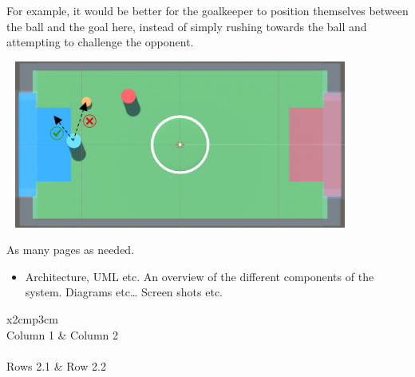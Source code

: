 \begin{flushleft}
For example, it would be better for the goalkeeper to position themselves between the ball and the goal here, instead of simply rushing towards the ball and attempting to challenge the opponent.
\end{flushleft}

\vspace{8mm}
\centering
\includegraphics[width=115mm, height=55mm]{img/Image4.png}
\vspace{8mm}

As many pages as needed.
\begin{itemize}
\item Architecture, UML etc. An overview of the different components of the system. Diagrams etc… Screen shots etc.
\end{itemize}

\begin{table}[h]
  \centering
  \begin{tabular}{x{2cm}p{3cm}}
    \toprule \\
    Column 1 & Column 2 \\
    \midrule \\
    Rows 2.1 & Row 2.2 \\
    \bottomrule
  \end{tabular}
  \caption{A table.}
  \label{table:mytable}
\end{table}